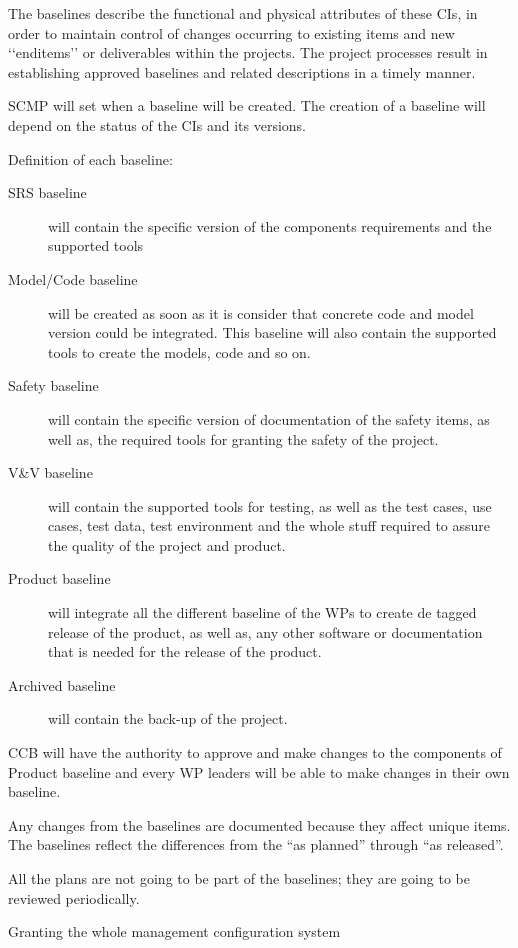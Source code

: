 \documentclass{template/openetcs_article}
\begin{document}
The baselines describe the functional and physical attributes of these CIs, in order to maintain control of changes occurring to existing items and new {\textquoteleft}{\textquoteleft}enditems{\textquoteright}{\textquoteright} or deliverables within the projects. The project processes result in establishing approved baselines and related descriptions in a timely manner. 

SCMP will set when a baseline will be created. The creation of a baseline will depend on the status of the CIs and its versions.


Definition of each baseline:
\begin{description}
\item[SRS baseline] will contain the specific version of the components requirements and the supported tools
\item[Model/Code baseline] will be created as soon as it is consider that concrete code and model version could be integrated. This baseline will also contain the supported tools to create the models, code and so on.
\item[Safety baseline] will contain the specific version of documentation of the safety items, as well as, the required tools for granting the safety of the project. 
\item[V\&V baseline] will contain the supported tools for testing, as well as the test cases, use cases, test data, test environment and the whole stuff required to assure the quality of the project and product.
\item[Product baseline] will integrate all the different baseline of the WPs to create de tagged release of the product, as well as, any other software or documentation that is needed for the release of the product.
\item[Archived baseline] will contain the back-up of the project. 
\end{description}

CCB will have the authority to approve and make changes to the components of Product baseline and every WP leaders will be able to make changes in their own baseline.

Any changes from the baselines are documented because they affect unique items. The baselines reflect the differences from the ``as planned'' through ``as released''.

All the plans are not going to be part of the baselines; they are going to be reviewed periodically.

Granting the whole management configuration system
\end{document}
